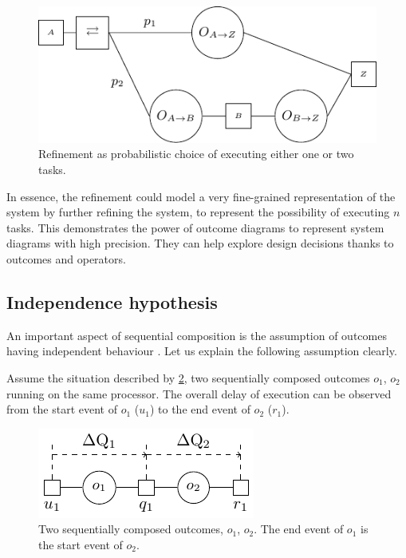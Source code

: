    \begin{figure}[H]
            \begin{center}
                \includegraphics[scale = 1]{tikz/ref_op.pdf}
            \end{center}
            \caption{Refinement as probabilistic choice of executing either one or two tasks.}
            \label{fig:prob_ref}
        \end{figure}
    In essence, the refinement could model a very fine-grained representation of the system by further refining the system, to represent the possibility of executing $n$ tasks. This demonstrates the power of outcome diagrams to represent system diagrams with high precision. They can help explore design decisions thanks to outcomes and operators.

    \subsection{Independence hypothesis} \label{indep_hyp} 
        An important aspect of sequential composition is the assumption of outcomes having independent behaviour \cite{post}. Let us explain the following assumption clearly.

        Assume the situation described by \cref{fig:otc_indep}, two sequentially composed outcomes $o_1$, $o_2$ running on the same processor. The overall delay of execution can be observed from the start event of $o_1$ ($u_1$) to the end event of $o_2$ ($r_1$). 
        \begin{figure}[H]
            \begin{center}
                \includegraphics[scale=1]{tikz/indep.pdf}
            \end{center}
            \label{fig:otc_indep}
            \caption{Two sequentially composed outcomes, $o_1$, $o_2$. The end event of $o_1$ is the start event of $o_2$.}
        \end{figure}
        
